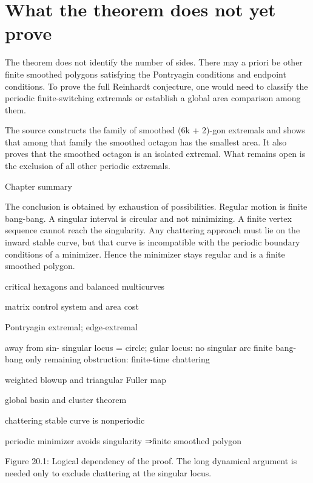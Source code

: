 \section{What the theorem does not yet prove}

The theorem does not identify the number of sides. There may a priori be other finite smoothed polygons satisfying the Pontryagin conditions and endpoint conditions. To prove the full Reinhardt conjecture, one would need to classify the periodic finite-switching extremals or establish a global area comparison among them.


The source constructs the family of smoothed (6k + 2)-gon extremals and shows that among that family the smoothed octagon has the smallest area. It also proves that the smoothed octagon is an isolated extremal. What remains open is the exclusion of all other periodic extremals.


\begin{insightbox}{Chapter summary}
\end{insightbox}

The conclusion is obtained by exhaustion of possibilities. Regular motion is finite bang-bang. A singular interval is circular and not minimizing. A finite vertex sequence cannot reach the singularity. Any chattering approach must lie on the inward stable curve, but that curve is incompatible with the periodic boundary conditions of a minimizer. Hence the minimizer stays regular and is a finite smoothed polygon.


critical hexagons and balanced multicurves


matrix control system and area cost


Pontryagin extremal; edge-extremal


away from sin- singular locus = circle; gular locus: no singular arc finite bang-bang only remaining obstruction: finite-time chattering


weighted blowup and triangular Fuller map


global basin and cluster theorem


chattering stable curve is nonperiodic


periodic minimizer avoids singularity ⇒finite smoothed polygon


\begin{figureplaceholder}
Figure 20.1: Logical dependency of the proof. The long dynamical argument is needed only to exclude chattering at the singular locus.
\end{figureplaceholder}

